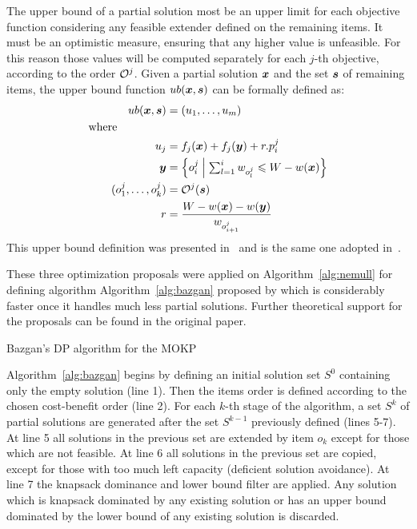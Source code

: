 The upper bound of a partial solution most be an upper limit for each
objective function considering any feasible extender defined on the remaining items.
It must be an optimistic measure, ensuring that any higher value is unfeasible.
For this reason those values will be computed separately for each $j$-th objective,
according to the order $\mathcal{O}^j$.
Given a partial solution $\boldsymbol{x}$ and the set $\boldsymbol{s}$ of remaining items,
the upper bound function $ub(\boldsymbol{x}, \boldsymbol{s})$ can be formally defined as:
\begin{align*}
    ub(\boldsymbol{x}, \boldsymbol{s}) &= (u_1, \ldots, u_{m})  \\
  \text{where} \phantom{mmmmm} \\
    u_j &= f_j(\boldsymbol{x}) + f_j(\boldsymbol{y}) + r.p^j_i\\
    \boldsymbol{y} &= \left\{ o_i^j \;\middle|\; \textstyle\sum_{l=1}^i w_{o_l^j} \leqslant W - w(\boldsymbol{x}) \right\} \\
    (o_1^j, \ldots, o_k^j) &= \mathcal{O}^j(\boldsymbol{s}) \\
    r &= \frac{W - w(\boldsymbol{x}) - w(\boldsymbol{y})}{w_{o^j_{i+1}}}
\end{align*}
This upper bound definition was presented in~\cite{martello1990knapsack}
and is the same one adopted in~\cite{bazgan2009}.

These three optimization proposals were applied on
Algorithm~\ref{alg:nemull} for defining algorithm 
Algorithm~\ref{alg:bazgan} proposed by \cite{bazgan2009} which
is considerably faster once it handles much less partial solutions.
Further theoretical support for the proposals can be found
in the original paper.

\begin{algorithm}
  \caption{Bazgan's DP algorithm for the MOKP}
  \label{alg:bazgan}
  
\end{algorithm}
Algorithm~\ref{alg:bazgan} begins by defining an initial solution set $S^0$ containing only the empty solution (line 1).
Then the items order is defined according to the chosen cost-benefit order (line 2).
For each $k$-th stage of the algorithm, a set $S^k$ of partial solutions are generated after the
set $S^{k-1}$ previously defined (lines 5-7).
At line 5 all solutions in the previous set are extended by item $o_k$ except for those which are not feasible.
At line 6 all solutions in the previous set are copied, except for those with too much left capacity (deficient solution avoidance).
At line 7 the knapsack dominance and lower bound filter are applied.
Any solution which is knapsack dominated by any existing solution or has an upper bound
dominated by the lower bound of any existing solution is discarded.

